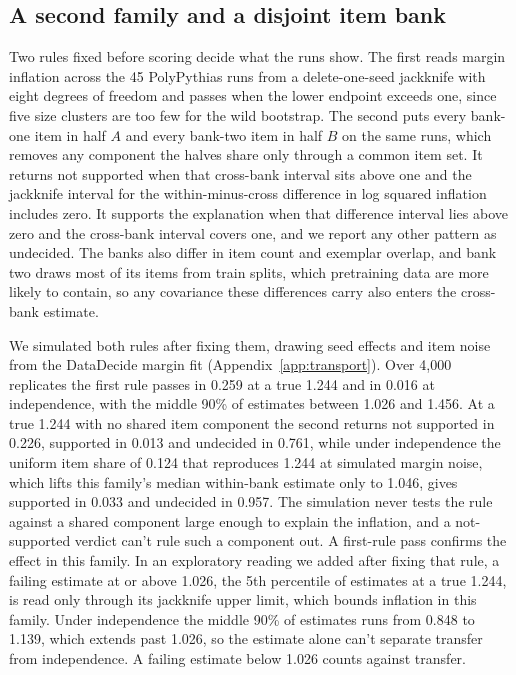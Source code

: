 \subsection{A second family and a disjoint item bank}
\label{sec:family}
Two rules fixed before scoring decide what the runs show. The first reads margin inflation across the 45 PolyPythias runs from a delete-one-seed jackknife with eight degrees of freedom and passes when the lower endpoint exceeds one, since five size clusters are too few for the wild bootstrap. The second puts every bank-one item in half $A$ and every bank-two item in half $B$ on the same runs, which removes any component the halves share only through a common item set. It returns not supported when that cross-bank interval sits above one and the jackknife interval for the within-minus-cross difference in log squared inflation includes zero. It supports the explanation when that difference interval lies above zero and the cross-bank interval covers one, and we report any other pattern as undecided. The banks also differ in item count and exemplar overlap, and bank two draws most of its items from train splits, which pretraining data are more likely to contain, so any covariance these differences carry also enters the cross-bank estimate.

We simulated both rules after fixing them, drawing seed effects and item noise from the DataDecide margin fit (Appendix~\ref{app:transport}). Over 4,000 replicates the first rule passes in 0.259 at a true 1.244 and in 0.016 at independence, with the middle 90\% of estimates between 1.026 and 1.456. At a true 1.244 with no shared item component the second returns not supported in 0.226, supported in 0.013 and undecided in 0.761, while under independence the uniform item share of 0.124 that reproduces 1.244 at simulated margin noise, which lifts this family's median within-bank estimate only to 1.046, gives supported in 0.033 and undecided in 0.957. The simulation never tests the rule against a shared component large enough to explain the inflation, and a not-supported verdict can't rule such a component out. A first-rule pass confirms the effect in this family. In an exploratory reading we added after fixing that rule, a failing estimate at or above 1.026, the 5th percentile of estimates at a true 1.244, is read only through its jackknife upper limit, which bounds inflation in this family. Under independence the middle 90\% of estimates runs from 0.848 to 1.139, which extends past 1.026, so the estimate alone can't separate transfer from independence. A failing estimate below 1.026 counts against transfer.

